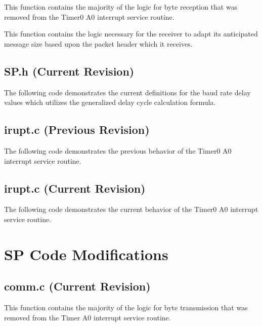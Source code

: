 \documentclass{article}
\begin{document}
This function contains the majority of the logic for byte reception that was removed from the Timer0 A0 interrupt service routine.
	

This function contains the logic necessary for the receiver to adapt its anticipated message size based upon the packet header which it receives.
	

	\subsection{SP.h (Current Revision)}
The following code demonstrates the current definitions for the baud rate delay values which utilizes the generalized delay cycle calculation formula.
	

	\subsection{irupt.c (Previous Revision)}	
The following code demonstrates the previous behavior of the Timer0 A0 interrupt service routine.
	

	\subsection{irupt.c (Current Revision)}
The following code demonstrates the current behavior of the Timer0 A0 interrupt service routine.
	


\newpage
\section{SP Code Modifications}
	\subsection{comm.c (Current Revision)}
This function contains the majority of the logic for byte transmission that was removed from the Timer A0 interrupt service routine.
	
\end{document}
